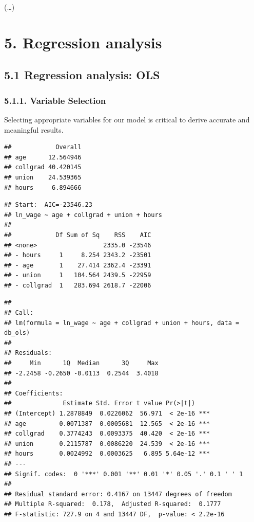 \documentclass[
]{article}
\begin{document}
(\ldots)

\section{5. Regression analysis}\label{regression-analysis}

\subsection{5.1 Regression analysis: OLS}\label{regression-analysis-ols}

\subsubsection{5.1.1. Variable Selection}\label{variable-selection}

Selecting appropriate variables for our model is critical to derive
accurate and meaningful results.

\begin{verbatim}
##            Overall
## age      12.564946
## collgrad 40.420145
## union    24.539365
## hours     6.894666
\end{verbatim}

\begin{verbatim}
## Start:  AIC=-23546.23
## ln_wage ~ age + collgrad + union + hours
## 
##            Df Sum of Sq    RSS    AIC
## <none>                  2335.0 -23546
## - hours     1     8.254 2343.2 -23501
## - age       1    27.414 2362.4 -23391
## - union     1   104.564 2439.5 -22959
## - collgrad  1   283.694 2618.7 -22006
\end{verbatim}

\begin{verbatim}
## 
## Call:
## lm(formula = ln_wage ~ age + collgrad + union + hours, data = db_ols)
## 
## Residuals:
##     Min      1Q  Median      3Q     Max 
## -2.2458 -0.2650 -0.0113  0.2544  3.4018 
## 
## Coefficients:
##              Estimate Std. Error t value Pr(>|t|)    
## (Intercept) 1.2878849  0.0226062  56.971  < 2e-16 ***
## age         0.0071387  0.0005681  12.565  < 2e-16 ***
## collgrad    0.3774243  0.0093375  40.420  < 2e-16 ***
## union       0.2115787  0.0086220  24.539  < 2e-16 ***
## hours       0.0024992  0.0003625   6.895 5.64e-12 ***
## ---
## Signif. codes:  0 '***' 0.001 '**' 0.01 '*' 0.05 '.' 0.1 ' ' 1
## 
## Residual standard error: 0.4167 on 13447 degrees of freedom
## Multiple R-squared:  0.178,  Adjusted R-squared:  0.1777 
## F-statistic: 727.9 on 4 and 13447 DF,  p-value: < 2.2e-16
\end{verbatim}
\end{document}

